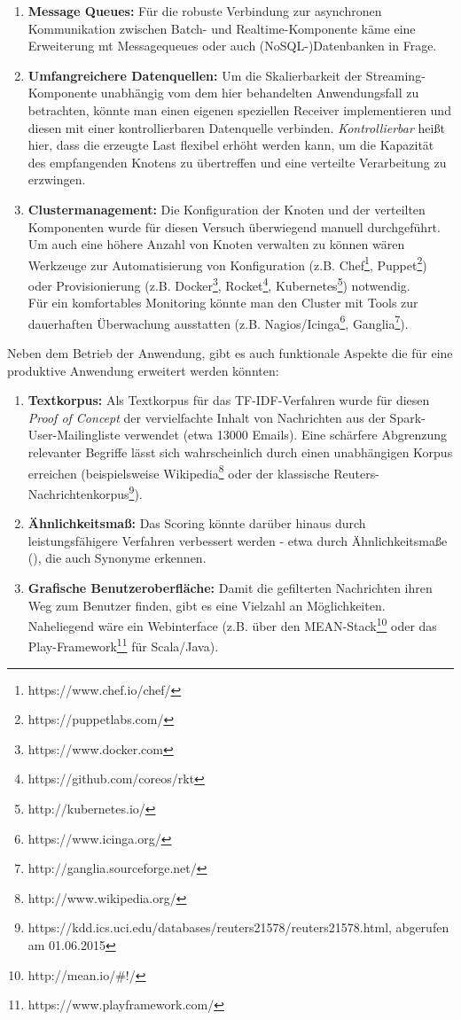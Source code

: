 \begin{enumerate}
	\item \textbf{Message Queues:} Für die robuste Verbindung zur asynchronen Kommunikation zwischen Batch- und Realtime-Komponente käme eine Erweiterung mt Messagequeues oder auch (NoSQL-)Datenbanken in Frage.
	\item \textbf{Umfangreichere Datenquellen:} Um die Skalierbarkeit der Streaming-Komponente unabhängig vom dem hier behandelten Anwendungsfall zu betrachten, könnte man einen eigenen speziellen Receiver implementieren und diesen mit einer kontrollierbaren Datenquelle verbinden. \textit{Kontrollierbar} heißt hier, dass die erzeugte Last flexibel erhöht werden kann, um die Kapazität des empfangenden Knotens zu übertreffen und eine verteilte Verarbeitung zu erzwingen.
	\item \textbf{Clustermanagement:} Die Konfiguration der Knoten und der verteilten Komponenten wurde für diesen Versuch überwiegend manuell durchgeführt. Um auch eine höhere Anzahl von Knoten verwalten zu können wären Werkzeuge zur Automatisierung von Konfiguration (z.B. Chef\footnote{https://www.chef.io/chef/}, Puppet\footnote{https://puppetlabs.com/}) oder Provisionierung (z.B. Docker\footnote{https://www.docker.com}, Rocket\footnote{https://github.com/coreos/rkt}, Kubernetes\footnote{http://kubernetes.io/}) notwendig.\\
	Für ein komfortables Monitoring könnte man den Cluster mit Tools zur dauerhaften Überwachung ausstatten (z.B. Nagios/Icinga\footnote{https://www.icinga.org/}, Ganglia\footnote{http://ganglia.sourceforge.net/}).
\end{enumerate}

Neben dem Betrieb der Anwendung, gibt es auch funktionale Aspekte die für eine produktive Anwendung erweitert werden könnten:

\begin{enumerate}
	\item \textbf{Textkorpus:} Als Textkorpus für das TF-IDF-Verfahren wurde für diesen \textit{Proof of Concept} der vervielfachte Inhalt von Nachrichten aus der Spark-User-Mailingliste verwendet (etwa 13000 Emails). Eine schärfere Abgrenzung relevanter Begriffe lässt sich wahrscheinlich durch einen unabhängigen Korpus erreichen (beispielsweise Wikipedia\footnote{http://www.wikipedia.org/} oder der klassische Reuters-Nachrichtenkorpus\footnote{https://kdd.ics.uci.edu/databases/reuters21578/reuters21578.html, abgerufen am 01.06.2015}).
	\item \textbf{Ähnlichkeitsmaß:} Das Scoring könnte darüber hinaus durch leistungsfähigere Verfahren verbessert werden - etwa durch Ähnlichkeitsmaße (\cite{Huang:2008}), die auch Synonyme erkennen.
	\item \textbf{Grafische Benutzeroberfläche:} Damit die gefilterten Nachrichten ihren Weg zum Benutzer finden, gibt es eine Vielzahl an Möglichkeiten. Naheliegend wäre ein Webinterface (z.B. über den MEAN-Stack\footnote{http://mean.io/#!/} oder das Play-Framework\footnote{https://www.playframework.com/} für Scala/Java).
\end{enumerate}